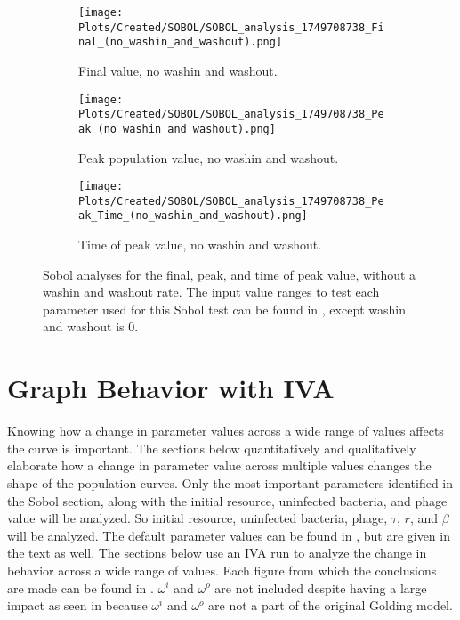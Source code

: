 \begin{figure}[ht!]
    \centering
    \begin{subfigure}{0.32\linewidth}
        \centering
        \captionsetup{width=1\linewidth}
        \texttt{[image: Plots/Created/SOBOL/SOBOL\_analysis\_1749708738\_Final\_(no\_washin\_and\_washout).png]}
        \caption{
            Final value, no washin and washout. 
        }
        \label{fig:created:Sobol_final_no_wi_wo}
    \end{subfigure}
    \hfill
    \begin{subfigure}{0.32\linewidth}
        \centering
        \captionsetup{width=1\linewidth}
        \texttt{[image: Plots/Created/SOBOL/SOBOL\_analysis\_1749708738\_Peak\_(no\_washin\_and\_washout).png]}
        \caption{
            Peak population value, no washin and washout. 
        }
        \label{fig:created:Sobol_peak_no_wi_wo}
    \end{subfigure}
    \hfill
    \begin{subfigure}{0.32\linewidth}
        \centering
        \captionsetup{width=1\linewidth}
        \texttt{[image: Plots/Created/SOBOL/SOBOL\_analysis\_1749708738\_Peak\_Time\_(no\_washin\_and\_washout).png]}
        \caption{
            Time of peak value, no washin and washout. 
        }
        \label{fig:created:Sobol_peak_time_no_wi_wo}
    \end{subfigure}
    \caption{
        Sobol analyses for the final, peak, and time of peak value, without a washin and washout rate.
        The input value ranges to test each parameter used for this Sobol test can be found in , except washin and washout is 0. 
    }
    \label{fig:created:Sobol_no_wi_wo}
\end{figure}

\section{Graph Behavior with IVA}
Knowing how a change in parameter values across a wide range of values affects the curve is important. 
The sections below quantitatively and qualitatively elaborate how a change in parameter value across multiple values changes the shape of the population curves. 
Only the most important parameters identified in the Sobol section, along with the initial resource, uninfected bacteria, and phage value will be analyzed. 
So initial resource, uninfected bacteria, phage, $\tau$, $r$, and $\beta$ will be analyzed. 
The default parameter values can be found in , but are given in the text as well. 
The sections below use an IVA run to analyze the change in behavior across a wide range of values. 
Each figure from which the conclusions are made can be found in . 
$\omega^i$ and $\omega^o$ are not included despite having a large impact as seen in  because $\omega^i$ and $\omega^o$ are not a part of the original Golding model. 

